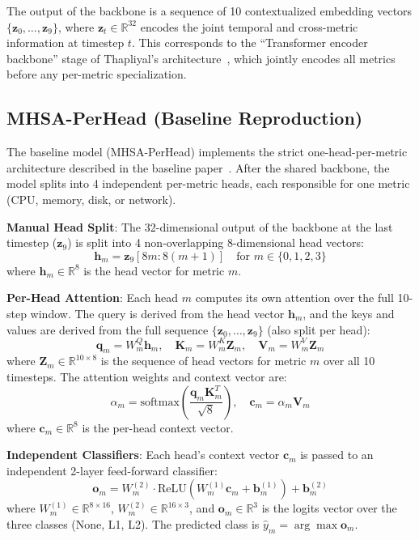 The output of the backbone is a sequence of 10 contextualized embedding vectors $\{\mathbf{z}_0, \ldots, \mathbf{z}_9\}$, where $\mathbf{z}_t \in \mathbb{R}^{32}$ encodes the joint temporal and cross-metric information at timestep $t$. This corresponds to the ``Transformer encoder backbone'' stage of Thapliyal's architecture~\cite{Thapliyal26}, which jointly encodes all metrics before any per-metric specialization.

\subsection{MHSA-PerHead (Baseline Reproduction)}
\label{subsec:perhead}

The baseline model (MHSA-PerHead) implements the strict one-head-per-metric architecture described in the baseline paper~\cite{Thapliyal26}. After the shared backbone, the model splits into 4 independent per-metric heads, each responsible for one metric (CPU, memory, disk, or network).

\textbf{Manual Head Split}: The 32-dimensional output of the backbone at the last timestep ($\mathbf{z}_9$) is split into 4 non-overlapping 8-dimensional head vectors:
\begin{equation}
\mathbf{h}_m = \mathbf{z}_9[8m : 8(m+1)] \quad \text{for } m \in \{0, 1, 2, 3\}
\end{equation}
where $\mathbf{h}_m \in \mathbb{R}^8$ is the head vector for metric $m$.

\textbf{Per-Head Attention}: Each head $m$ computes its own attention over the full 10-step window. The query is derived from the head vector $\mathbf{h}_m$, and the keys and values are derived from the full sequence $\{\mathbf{z}_0, \ldots, \mathbf{z}_9\}$ (also split per head):
\begin{equation}
\mathbf{q}_m = W_m^Q \mathbf{h}_m, \quad \mathbf{K}_m = W_m^K \mathbf{Z}_m, \quad \mathbf{V}_m = W_m^V \mathbf{Z}_m
\end{equation}
where $\mathbf{Z}_m \in \mathbb{R}^{10 \times 8}$ is the sequence of head vectors for metric $m$ over all 10 timesteps. The attention weights and context vector are:
\begin{equation}
\alpha_m = \text{softmax}\left(\frac{\mathbf{q}_m \mathbf{K}_m^T}{\sqrt{8}}\right), \quad \mathbf{c}_m = \alpha_m \mathbf{V}_m
\end{equation}
where $\mathbf{c}_m \in \mathbb{R}^8$ is the per-head context vector.

\textbf{Independent Classifiers}: Each head's context vector $\mathbf{c}_m$ is passed to an independent 2-layer feed-forward classifier:
\begin{equation}
\mathbf{o}_m = W_m^{(2)} \cdot \text{ReLU}(W_m^{(1)} \mathbf{c}_m + \mathbf{b}_m^{(1)}) + \mathbf{b}_m^{(2)}
\end{equation}
where $W_m^{(1)} \in \mathbb{R}^{8 \times 16}$, $W_m^{(2)} \in \mathbb{R}^{16 \times 3}$, and $\mathbf{o}_m \in \mathbb{R}^3$ is the logits vector over the three classes (None, L1, L2). The predicted class is $\hat{y}_m = \arg\max \mathbf{o}_m$.

